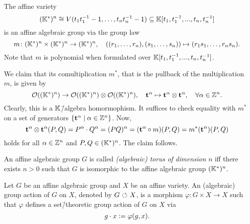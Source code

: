 \begin{ex}
	\label{example:algebraic_torus}
	The affine variety $$(\mathbb{K}^*)^n \cong V(t_1t_1^{-1} - 1,\dots, t_nt_n^{-1}-1)\subseteq\mathbb{K}[t_1,t_1^{-1},...,t_n,t_n^{-1}]$$
	is an affine algebraic group via the group law
	$$m\colon (\mathbb{K}^*)^n \times (\mathbb{K}^*)^n \rightarrow (\mathbb{K}^*)^n,\quad ((r_1,\dots,r_n),(s_1,\dots,s_n)) \mapsto (r_1s_1,\dots,r_ns_n).$$
	Note that $m$ is polynomial when formulated over $\mathbb{K}[t_1,t_1^{-1},...,t_n,t_n^{-1}]$.
	
	We claim that its comultiplication $m^*$, that is the pullback of the multiplication $m$, is given by
	$$\mathcal{O}((\mathbb{K}^*)^n) \rightarrow \mathcal{O}((\mathbb{K}^*)^n) \otimes \mathcal{O}((\mathbb{K}^*)^n),\quad \mathbf{t}^\alpha \mapsto \mathbf{t}^\alpha \otimes \mathbf{t}^\alpha,\quad \forall \alpha\in\mathbb{Z}^n.$$
	Clearly, this is a $\mathbb{K}$\=/algebra homormophism. It suffices to check equality with $m^*$ on a set of generators $\{\mathbf{t}^\alpha\mid \alpha\in\mathbb{Z}^n\}$. Now, 
	$$\mathbf{t}^\alpha \otimes \mathbf{t}^\alpha (P, Q) = P^\alpha\cdot Q^\alpha = (PQ)^\alpha =  (\mathbf{t}^\alpha \circ m) (P,Q) = m^*(\mathbf{t}^\alpha) (P,Q)$$ holds for all $\alpha\in\mathbb{Z}^n$ and $P,Q\in(\mathbb{K}^*)^n$. The claim follows.
\end{ex}

\begin{defi}
	An affine algebraic group $G$ is called \emph{(algebraic) torus of dimension $n$} iff there exists $n>0$ such that $G$ is isomorphic to the affine algebraic group $(\mathbb{K}^*)^n$.
\end{defi}


\begin{defi}
	Let $G$ be an affine algebraic group and $X$ be an affine variety. An (algebraic) group action of $G$ on $X$, denoted by $G{\ \circlearrowleft\ } X$, is a morphism $\varphi\colon G\times X \rightarrow X$ such that $\varphi$ defines a set\=/theoretic group action of $G$ on $X$ via
	$$g\cdot x \mathrel{\mathop:}= \varphi(g,x).$$
\end{defi}

